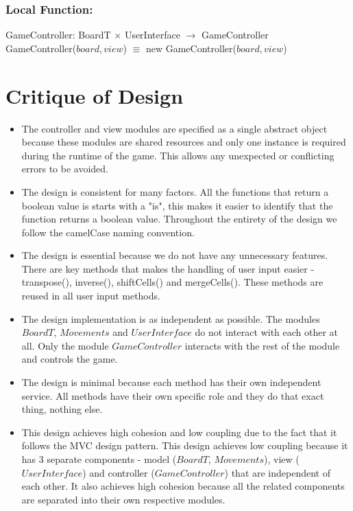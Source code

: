 \documentclass[12pt]{article}
\begin{document}
\subsubsection*{Local Function:}
GameController: BoardT $\times$ UserInterface $\rightarrow$ GameController \\
GameController($board, view$) $\equiv$ new GameController($board, view$)

\newpage

\section*{Critique of Design}

\begin{itemize}
    \item The controller and view modules are specified as a single abstract object because these modules are shared resources and only one instance is required during the runtime of the game. This allows any unexpected or conflicting errors to be avoided.
    \item The design is consistent for many factors. All the functions that return a boolean value is starts with a "is", this makes it easier to identify that the function returns a boolean value. Throughout the entirety of the design we follow the camelCase naming convention.
    \item The design is essential because we do not have any unnecessary features. There are key methods that makes the handling of user input easier - transpose(), inverse(), shiftCells() and mergeCells(). These methods are reused in all user input methods. 
    \item The design implementation is as independent as possible. The modules $BoardT$, $Movements$ and $UserInterface$ do not interact with each other at all. Only the module $GameController$ interacts with the rest of the module and controls the game.
    \item The design is minimal because each method has their own independent service. All methods have their own specific role and they do that exact thing, nothing else.
    \item This design achieves high cohesion and low coupling due to the fact that it follows the MVC design pattern. This design achieves low coupling because it has 3 separate components - model ($BoardT$, $Movements$), view ($UserInterface$) and controller ($GameController$) that are independent of each other. It also achieves high cohesion because all the related components are separated into their own respective modules.

\end{itemize}
\end{document}
